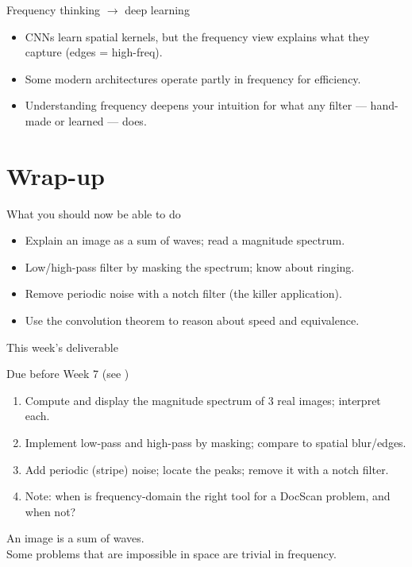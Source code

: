 \documentclass[10pt,aspectratio=169]{beamer}
\begin{document}
\begin{frame}{Frequency thinking $\rightarrow$ deep learning}
  \begin{itemize}
    \item CNNs learn spatial kernels, but the frequency view explains what they capture (edges = high-freq).
    \item Some modern architectures operate partly in frequency for efficiency.
    \item Understanding frequency deepens your intuition for what any filter — hand-made or learned — does.
  \end{itemize}
\end{frame}

\section{Wrap-up}

\begin{frame}{What you should now be able to do}
  \begin{itemize}
    \item Explain an image as a sum of waves; read a magnitude spectrum.
    \item Low/high-pass filter by masking the spectrum; know about ringing.
    \item Remove periodic noise with a notch filter (the killer application).
    \item Use the convolution theorem to reason about speed and equivalence.
  \end{itemize}
\end{frame}

\begin{frame}{This week's deliverable}
  \begin{alertblock}{Due before Week 7 (see )}
    \begin{enumerate}
      \item Compute and display the magnitude spectrum of 3 real images; interpret each.
      \item Implement low-pass and high-pass by masking; compare to spatial blur/edges.
      \item Add periodic (stripe) noise; locate the peaks; remove it with a notch filter.
      \item Note: when is frequency-domain the right tool for a DocScan problem, and when not?
    \end{enumerate}
  \end{alertblock}
\end{frame}

\begin{frame}[standout]
  An image is a sum of waves.\\[4pt]
  \normalsize Some problems that are impossible in space are trivial in frequency.
\end{frame}
\end{document}
